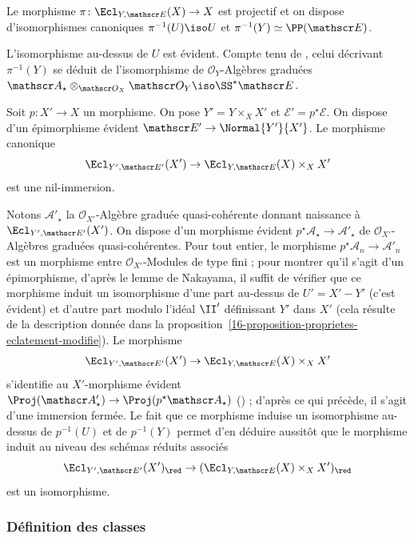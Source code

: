\documentclass[10pt]{../fichiers-configuration-latex/smfart}
\begin{document}
\begin{corollaire3}\label{16-corollaire-structure-eclatement-modifie}
Le morphisme $\pi\colon \Ecl_{Y,\mathscr E}(X)\to X$ est projectif et on
dispose d'isomorphismes canoniques $\pi^{-1}(U)\iso U$ et
$\pi^{-1}(Y)\simeq \PP(\mathscr E)$.
\end{corollaire3}

L'isomorphisme au-dessus de $U$ est évident. Compte tenu de ,
celui décrivant $\pi^{-1}(Y)$
se déduit de l'isomorphisme de $\mathscr O_Y$-Algèbres graduées $\mathscr
A_\star \otimes_{\mathscr O_X}\mathscr O_Y\iso \SS^\star\mathscr E$.

\begin{proposition3}\label{16-proposition-cb-eclatements-modifies}
Soit $p\colon X'\to X$ un morphisme.
On pose $Y'=Y\times_X X'$ et $\mathscr E'=p^\star \mathscr E$. On dispose
d'un épimorphisme évident $\mathscr E'\to\Normal {Y'} {X'}$. Le
morphisme canonique
\[\Ecl_{Y',\mathscr E'}(X')\to \Ecl_{Y,\mathscr E}(X)\times_X X'\]
est une nil-immersion.
\end{proposition3}

Notons $\mathscr A'_\star$ la $\mathscr O_{X'}$-Algèbre 
graduée quasi-cohérente donnant
naissance à $\Ecl_{Y',\mathscr E'}(X')$. On dispose d'un morphisme évident 
$p^\star \mathscr A_\star\to\mathscr A'_\star$ de $\mathscr
O_{X'}$-Algèbres graduées quasi-cohérentes. Pour tout entier, le morphisme
$p^\star \mathscr A_n\to \mathscr A'_n$ est un morphisme entre $\mathscr
O_{X'}$-Modules de type fini ; pour montrer qu'il s'agit d'un épimorphisme,
d'après le lemme de Nakayama, il suffit de vérifier que ce morphisme
induit un isomorphisme d'une part au-dessus de $U'=X'-Y'$ (c'est
évident) et d'autre part modulo l'idéal $\II'$ définissant $Y'$ dans $X'$
(cela résulte de la description donnée dans la 
proposition~\ref{16-proposition-proprietes-eclatement-modifie}). Le morphisme 
\[\Ecl_{Y',\mathscr E'}(X')\to \Ecl_{Y,\mathscr E}(X)\times_X X'\]
s'identifie au $X'$-morphisme évident
$\Proj(\mathscr A'_\star)\to \Proj (p^\star \mathscr A_\star)$
() ; d'après ce
qui précède, il s'agit d'une immersion fermée. Le fait que ce morphisme
induise un isomorphisme au-dessus de $p^{-1}(U)$ et de $p^{-1}(Y)$
permet d'en déduire aussitôt que le morphisme induit au niveau des schémas
réduits associés
\[\Ecl_{Y',\mathscr E'}(X')_{\red}\to (\Ecl_{Y,\mathscr E}(X)\times_X
X')_\red\]
est un isomorphisme.

\subsubsection{Définition des classes}%
\end{document}
